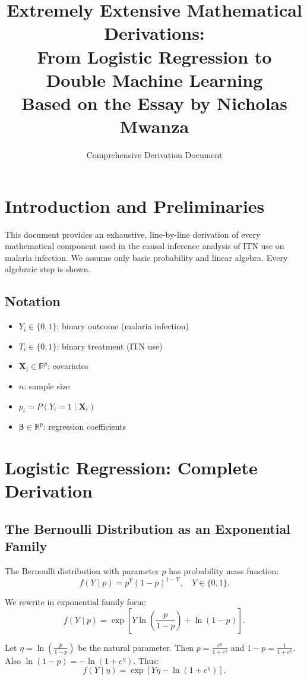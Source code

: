 \documentclass[12pt]{article}
\title{Extremely Extensive Mathematical Derivations: \\
	From Logistic Regression to Double Machine Learning \\
	\large Based on the Essay by Nicholas Mwanza}
\author{Comprehensive Derivation Document}
\date{}
\numberwithin{equation}{section}
\begin{document}
	
	\maketitle
	\tableofcontents
	
	\section{Introduction and Preliminaries}
	
	This document provides an exhaustive, line-by-line derivation of every mathematical component used in the causal inference analysis of ITN use on malaria infection. We assume only basic probability and linear algebra. Every algebraic step is shown.
	
	\subsection{Notation}
	\begin{itemize}
		\item $Y_i \in \{0,1\}$: binary outcome (malaria infection)
		\item $T_i \in \{0,1\}$: binary treatment (ITN use)
		\item $\mathbf{X}_i \in \mathbb{R}^p$: covariates
		\item $n$: sample size
		\item $p_i = P(Y_i=1 \mid \mathbf{X}_i)$
		\item $\boldsymbol{\beta} \in \mathbb{R}^p$: regression coefficients
	\end{itemize}
	
	\section{Logistic Regression: Complete Derivation}
	
	\subsection{The Bernoulli Distribution as an Exponential Family}
	
	The Bernoulli distribution with parameter $p$ has probability mass function:
	\[
	f(Y \mid p) = p^Y (1-p)^{1-Y}, \quad Y \in \{0,1\}.
	\]
	
	We rewrite in exponential family form:
	\[
	f(Y \mid p) = \exp\left[ Y \ln\left(\frac{p}{1-p}\right) + \ln(1-p) \right].
	\]
	
	Let $\eta = \ln\left(\frac{p}{1-p}\right)$ be the natural parameter. Then $p = \frac{e^\eta}{1+e^\eta}$ and $1-p = \frac{1}{1+e^\eta}$. Also $\ln(1-p) = -\ln(1+e^\eta)$. Thus:
	\[
	f(Y \mid \eta) = \exp\left[ Y\eta - \ln(1+e^\eta) \right].
	\]
	
\end{document}
